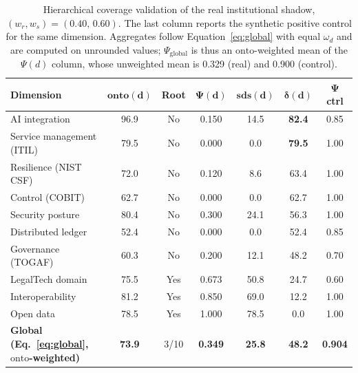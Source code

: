 \documentclass[engproc,proceedingpaper,submit,moreauthors]{Definitions/mdpi}
\begin{document}
\begin{table}[H]
\small
\caption{Hierarchical coverage validation of the real institutional shadow, $(w_r,w_s)=(0.40,\,0.60)$. The last column reports the synthetic positive control for the same dimension. Aggregates follow Equation~\eqref{eq:global} with equal $\omega_d$ and are computed on unrounded values; $\Psi_{\mathrm{global}}$ is thus an $\mathrm{onto}$-weighted mean of the $\Psi(d)$ column, whose unweighted mean is 0.329 (real) and 0.900 (control).\label{tab:validation}}
\begin{tabularx}{\textwidth}{Xcccccc}
\toprule
\textbf{Dimension} & $\mathbf{onto(d)}$ & \textbf{Root} & $\mathbf{\Psi(d)}$ & $\mathbf{sds(d)}$ & $\boldsymbol{\delta}\mathbf{(d)}$ & $\mathbf{\Psi}$ \textbf{ctrl}\\
\midrule
AI integration            & 96.9 & No  & 0.150 & 14.5 & \textbf{82.4} & 0.85\\
Service management (ITIL) & 79.5 & No  & 0.000 & 0.0  & \textbf{79.5} & 1.00\\
Resilience (NIST CSF)     & 72.0 & No  & 0.120 & 8.6  & 63.4 & 1.00\\
Control (COBIT)           & 62.7 & No  & 0.000 & 0.0  & 62.7 & 1.00\\
Security posture          & 80.4 & No  & 0.300 & 24.1 & 56.3 & 1.00\\
Distributed ledger        & 52.4 & No  & 0.000 & 0.0  & 52.4 & 0.85\\
Governance (TOGAF)        & 60.3 & No  & 0.200 & 12.1 & 48.2 & 0.70\\
LegalTech domain          & 75.5 & Yes & 0.673 & 50.8 & 24.7 & 0.60\\
Interoperability          & 81.2 & Yes & 0.850 & 69.0 & 12.2 & 1.00\\
Open data                 & 78.5 & Yes & 1.000 & 78.5 & 0.0  & 1.00\\
\midrule
\textbf{Global (Eq.~\eqref{eq:global}, $\mathrm{onto}$-weighted)} & \textbf{73.9} & 3/10 & \textbf{0.349} & \textbf{25.8} & \textbf{48.2} & \textbf{0.904}\\
\bottomrule
\end{tabularx}
\end{table}
\end{document}
